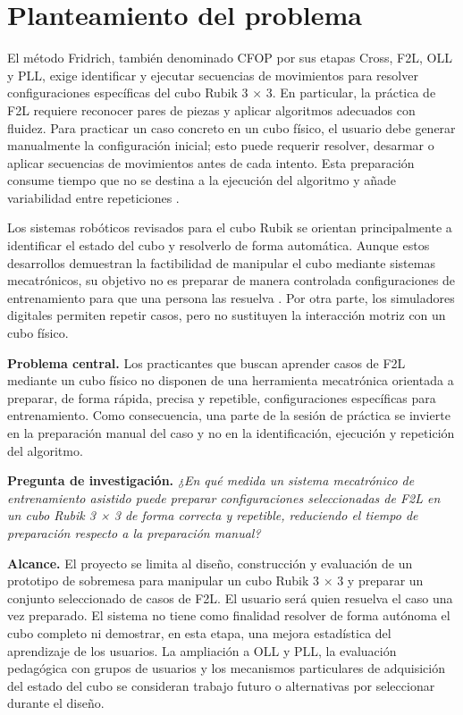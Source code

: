 \section{Planteamiento del problema}
El método Fridrich, también denominado CFOP por sus etapas Cross, F2L, OLL y PLL, exige identificar y ejecutar secuencias de movimientos para resolver configuraciones específicas del cubo Rubik 3 × 3. En particular, la práctica de F2L requiere reconocer pares de piezas y aplicar algoritmos adecuados con fluidez. Para practicar un caso concreto en un cubo físico, el usuario debe generar manualmente la configuración inicial; esto puede requerir resolver, desarmar o aplicar secuencias de movimientos antes de cada intento. Esta preparación consume tiempo que no se destina a la ejecución del algoritmo y añade variabilidad entre repeticiones \cite{Boyce2022}.

Los sistemas robóticos revisados para el cubo Rubik se orientan principalmente a identificar el estado del cubo y resolverlo de forma automática. Aunque estos desarrollos demuestran la factibilidad de manipular el cubo mediante sistemas mecatrónicos, su objetivo no es preparar de manera controlada configuraciones de entrenamiento para que una persona las resuelva \cite{Gorriz2023}. Por otra parte, los simuladores digitales permiten repetir casos, pero no sustituyen la interacción motriz con un cubo físico.

\textbf{Problema central.} Los practicantes que buscan aprender casos de F2L mediante un cubo físico no disponen de una herramienta mecatrónica orientada a preparar, de forma rápida, precisa y repetible, configuraciones específicas para entrenamiento. Como consecuencia, una parte de la sesión de práctica se invierte en la preparación manual del caso y no en la identificación, ejecución y repetición del algoritmo.

\textbf{Pregunta de investigación.} \emph{¿En qué medida un sistema mecatrónico de entrenamiento asistido puede preparar configuraciones seleccionadas de F2L en un cubo Rubik 3 × 3 de forma correcta y repetible, reduciendo el tiempo de preparación respecto a la preparación manual?}

\textbf{Alcance.} El proyecto se limita al diseño, construcción y evaluación de un prototipo de sobremesa para manipular un cubo Rubik 3 × 3 y preparar un conjunto seleccionado de casos de F2L. El usuario será quien resuelva el caso una vez preparado. El sistema no tiene como finalidad resolver de forma autónoma el cubo completo ni demostrar, en esta etapa, una mejora estadística del aprendizaje de los usuarios. La ampliación a OLL y PLL, la evaluación pedagógica con grupos de usuarios y los mecanismos particulares de adquisición del estado del cubo se consideran trabajo futuro o alternativas por seleccionar durante el diseño.

